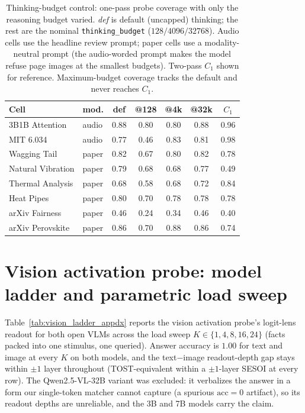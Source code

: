 \documentclass[11pt]{article}
\begin{document}
\begin{table}[h]
\small\centering
\caption{Thinking-budget control: one-pass probe coverage with only the reasoning budget varied. \emph{def} is default (uncapped) thinking; the rest are the nominal \texttt{thinking\_budget} ($128/4096/32768$). Audio cells use the headline review prompt; paper cells use a modality-neutral prompt (the audio-worded prompt makes the model refuse page images at the smallest budgets). Two-pass $C_1$ shown for reference. Maximum-budget coverage tracks the default and never reaches $C_1$.}
\label{tab:e10}
\begin{tabular}{llccccc}
\toprule
Cell & mod. & def & @128 & @4k & @32k & $C_1$ \\
\midrule
3B1B Attention    & audio & 0.88 & 0.80 & 0.80 & 0.88 & 0.96 \\
MIT 6.034         & audio & 0.77 & 0.46 & 0.83 & 0.81 & 0.98 \\
\midrule
Wagging Tail      & paper & 0.82 & 0.67 & 0.80 & 0.82 & 0.78 \\
Natural Vibration & paper & 0.79 & 0.68 & 0.68 & 0.77 & 0.49 \\
Thermal Analysis  & paper & 0.68 & 0.58 & 0.68 & 0.72 & 0.84 \\
Heat Pipes        & paper & 0.80 & 0.70 & 0.78 & 0.78 & 0.78 \\
arXiv Fairness    & paper & 0.46 & 0.24 & 0.34 & 0.46 & 0.40 \\
arXiv Perovskite  & paper & 0.86 & 0.70 & 0.88 & 0.86 & 0.74 \\
\bottomrule
\end{tabular}
\end{table}

\section{Vision activation probe: model ladder and parametric load sweep}
\label{appdx:vision_ladder}

Table~\ref{tab:vision_ladder_appdx} reports the vision activation probe's logit-lens readout for both open VLMs across the load sweep $K\in\{1,4,8,16,24\}$ (facts packed into one stimulus, one queried). Answer accuracy is $1.00$ for text and image at every $K$ on both models, and the text$-$image readout-depth gap stays within $\pm 1$ layer throughout (TOST-equivalent within a $\pm 1$-layer SESOI at every row). The Qwen2.5-VL-32B variant was excluded: it verbalizes the answer in a form our single-token matcher cannot capture (a spurious $\text{acc}=0$ artifact), so its readout depths are unreliable, and the 3B and 7B models carry the claim.
\end{document}
